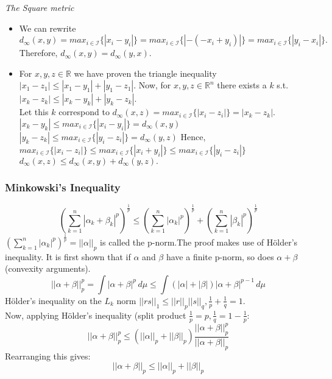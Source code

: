 \begin{frame}
\textit{The Square metric}\hfill\break
\begin{itemize}
    \item We can rewrite $d_{\infty}(x,y) = max_{i\in \mathcal{I}}\{|x_i -
    y_i|\} = max_{i\in \mathcal{I}}\{|- (- x_i + y_i)|\} = max_{i\in \mathcal{I}}\{|y_i - x_i|\}.$
    Therefore, $d_{\infty}(x,y) = d_{\infty}(y,x).$ \hfill\break
    \pause
    \item For $x,y,z \in \mathbb{R}$ we have proven the triangle inequality $|x_1 - z_1| \leq |x_1 - y_1| + |y_1 - z_1|$.  \hfill\break
    \hfill\break
     Now, for $x,y,z \in \mathbb{R}^n$ there exists a $k$ s.t. $|x_k - z_k| \leq |x_k - y_k| + |y_k - z_k|$. \\ Let this $k$ correspond to $d_{\infty}(x,z) = max_{i\in \mathcal{I}}\{|x_i - z_i|\} = |x_k - z_k|.$ \hfill\break
     \hfill\break
    $ |x_k - y_k| \leq max_{i\in \mathcal{I}}\{|x_i - y_i|\} = d_{\infty}(x,y)$
     \\
     $ |y_k - z_k| \leq max_{i\in \mathcal{I}}\{|y_i - z_i|\} = d_{\infty}(y,z)$
     \hfill\break
     \hfill\break
     Hence, $ max_{i\in \mathcal{I}}\{|x_i -
    z_i|\} \leq max_{i\in \mathcal{I}}\{|x_i + y_i|\} \leq max_{i\in \mathcal{I}}\{|y_i - z_i|\}$ \Rightarrow  $d_\infty(x,z) \leq d_\infty(x,y)+d_\infty(y,z).$
\end{itemize}
\end{frame}

\begin{frame}
\frametitle{Minkowski's Inequality}
\begin{equation*}
    (\sum_{k=1}^{n}|\alpha_k+\beta_k|^p)^\frac{1}{p} \leq (\sum_{k=1}^{n}|\alpha_k|^p)^\frac{1}{p} + (\sum_{k=1}^{n}|\beta_k|^p)^\frac{1}{p}
\end{equation*}
$(\sum_{k=1}^{n}|\alpha_k|^p)^\frac{1}{p} = ||\alpha||_p$ is called the
p-norm.The proof makes use of H\"older's inequality. It is first shown that if
$\alpha$ and $\beta$ have a finite p-norm, so does $\alpha+\beta$ (convexity
arguments).
\begin{equation*}
    ||\alpha+\beta||_p^p = \int |\alpha+\beta|^p \,d\mu \leq \int (|\alpha|+|\beta|)|\alpha+\beta|^{p-1} \,d\mu
\end{equation*}
H\"older's inequality on the $L_k$ norm $||rs||_1 \leq ||r||_p||s||_q, \frac{1}{p} + \frac{1}{q} = 1$. \\
Now, applying H\"older's inequality (split product $\frac{1}{p} = p, \frac{1}{q} = 1-\frac{1}{p}$:
\begin{equation*}
||\alpha+\beta||_p^p \leq  (||\alpha||_p+||\beta||_p)\frac{||\alpha+\beta||_p^p}{||\alpha+\beta||_p}
\end{equation*}
Rearranging this gives:
\begin{equation*}
||\alpha+\beta||_p \leq  ||\alpha||_p+||\beta||_p
\end{equation*}
\end{frame}

